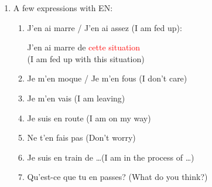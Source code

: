 \documentclass{book}
\begin{document}
\begin{enumerate}
            \item A few expressions with EN:
                \begin{enumerate}
                    \item J'en ai marre / J'en ai assez (I am fed up):
                        \begin{center}
                            J'en ai marre de \textcolor{red}{cette situation} \\
                            (I am fed up with this situation)
                        \end{center}
                    \item Je m'en moque / Je m'en fous (I don't care)
                    \item Je m'en vais (I am leaving)
                    \item Je suis en route (I am on my way)
                    \item Ne t'en fais pas (Don't worry)
                    \item Je suis en train de \dots (I am in the process of \dots)
                    \item Qu'est-ce que tu en passes? (What do you think?)
                \end{enumerate}
        \end{enumerate}
\end{document}
